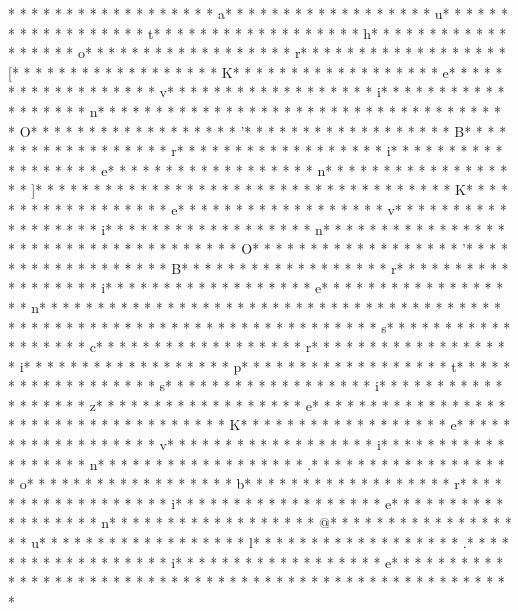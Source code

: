 * * *  * * *  * * *  *  * * *  *  * * *  * a* * *  * * *  * * *  *  * * *  *  * * *  * u* * *  * * *  * * *  *  * * *  *  * * *  * t* * *  * * *  * * *  *  * * *  *  * * *  * h* * *  * * *  * * *  *  * * *  *  * * *  * o* * *  * * *  * * *  *  * * *  *  * * *  * r* * *  * * *  * * *  *  * * *  *  * * *  * [* * *  * * *  * * *  *  * * *  *  * * *  * K* * *  * * *  * * *  *  * * *  *  * * *  * e* * *  * * *  * * *  *  * * *  *  * * *  * v* * *  * * *  * * *  *  * * *  *  * * *  * i* * *  * * *  * * *  *  * * *  *  * * *  * n* * *  * * *  * * *  *  * * *  *  * * *  *  * * *  * * *  * * *  *  * * *  *  * * *  * O* * *  * * *  * * *  *  * * *  *  * * *  * '* * *  * * *  * * *  *  * * *  *  * * *  * B* * *  * * *  * * *  *  * * *  *  * * *  * r* * *  * * *  * * *  *  * * *  *  * * *  * i* * *  * * *  * * *  *  * * *  *  * * *  * e* * *  * * *  * * *  *  * * *  *  * * *  * n* * *  * * *  * * *  *  * * *  *  * * *  * ]* * *  * * *  * * *  *  * * *  *  * * *  * {* * *  * * *  * * *  *  * * *  *  * * *  * K* * *  * * *  * * *  *  * * *  *  * * *  * e* * *  * * *  * * *  *  * * *  *  * * *  * v* * *  * * *  * * *  *  * * *  *  * * *  * i* * *  * * *  * * *  *  * * *  *  * * *  * n* * *  * * *  * * *  *  * * *  *  * * *  *  * * *  * * *  * * *  *  * * *  *  * * *  * O* * *  * * *  * * *  *  * * *  *  * * *  * '* * *  * * *  * * *  *  * * *  *  * * *  * B* * *  * * *  * * *  *  * * *  *  * * *  * r* * *  * * *  * * *  *  * * *  *  * * *  * i* * *  * * *  * * *  *  * * *  *  * * *  * e* * *  * * *  * * *  *  * * *  *  * * *  * n* * *  * * *  * * *  *  * * *  *  * * *  *  * * *  * * *  * * *  *  * * *  *  * * *  *  * * *  * * *  * * *  *  * * *  *  * * *  * {* * *  * * *  * * *  *  * * *  *  * * *  * s* * *  * * *  * * *  *  * * *  *  * * *  * c* * *  * * *  * * *  *  * * *  *  * * *  * r* * *  * * *  * * *  *  * * *  *  * * *  * i* * *  * * *  * * *  *  * * *  *  * * *  * p* * *  * * *  * * *  *  * * *  *  * * *  * t* * *  * * *  * * *  *  * * *  *  * * *  * s* * *  * * *  * * *  *  * * *  *  * * *  * i* * *  * * *  * * *  *  * * *  *  * * *  * z* * *  * * *  * * *  *  * * *  *  * * *  * e* * *  * * *  * * *  *  * * *  *  * * *  *  * * *  * * *  * * *  *  * * *  *  * * *  * K* * *  * * *  * * *  *  * * *  *  * * *  * e* * *  * * *  * * *  *  * * *  *  * * *  * v* * *  * * *  * * *  *  * * *  *  * * *  * i* * *  * * *  * * *  *  * * *  *  * * *  * n* * *  * * *  * * *  *  * * *  *  * * *  * .* * *  * * *  * * *  *  * * *  *  * * *  * o* * *  * * *  * * *  *  * * *  *  * * *  * b* * *  * * *  * * *  *  * * *  *  * * *  * r* * *  * * *  * * *  *  * * *  *  * * *  * i* * *  * * *  * * *  *  * * *  *  * * *  * e* * *  * * *  * * *  *  * * *  *  * * *  * n* * *  * * *  * * *  *  * * *  *  * * *  * @* * *  * * *  * * *  *  * * *  *  * * *  * u* * *  * * *  * * *  *  * * *  *  * * *  * l* * *  * * *  * * *  *  * * *  *  * * *  * .* * *  * * *  * * *  *  * * *  *  * * *  * i* * *  * * *  * * *  *  * * *  *  * * *  * e* * *  * * *  * * *  *  * * *  *  * * *  * }* * *  * * *  * * *  *  * * *  *  * * *  * }* * *  * * *  * * *  *  * * *  *  * * *  * 
